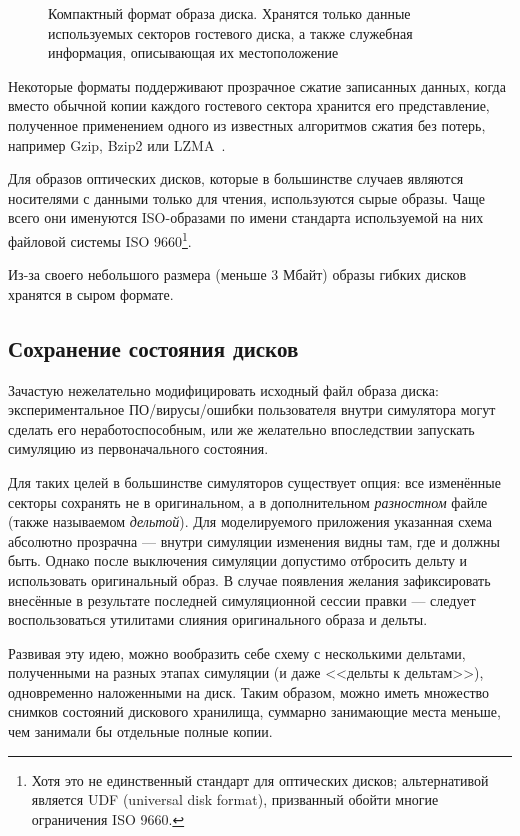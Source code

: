 \begin{figure}[htb]
    \centering
    \caption[Компактный формат образа диска]{Компактный формат образа диска. Хранятся только данные используемых секторов гостевого диска, а также служебная информация, описывающая их местоположение}
    \label{fig:compat}
\end{figure}

Некоторые форматы поддерживают прозрачное сжатие записанных данных, когда вместо обычной копии каждого гостевого сектора хранится его представление, полученное применением одного из известных алгоритмов сжатия без потерь, например Gzip, Bzip2 или LZMA~\cite{sayood2002lossless}.

Для образов оптических дисков, которые в большинстве  случаев являются носителями с данными только для чтения, используются сырые образы. Чаще всего они именуются ISO-образами по имени стандарта используемой на них файловой системы ISO 9660\footnote{Хотя это не единственный стандарт для оптических дисков; альтернативой является UDF (universal disk format), призванный обойти многие ограничения ISO 9660.}.

Из-за своего небольшого размера (меньше 3 Мбайт) образы гибких дисков хранятся в сыром формате.

\subsection{Сохранение состояния дисков}

Зачастую нежелательно модифицировать исходный файл образа диска: экспериментальное ПО/вирусы/ошибки пользователя внутри симулятора могут сделать его неработоспособным, или же желательно впоследствии запускать симуляцию из первоначального состояния.

Для таких целей в большинстве симуляторов существует опция: все изменённые секторы сохранять не в оригинальном, а в дополнительном \textit{разностном} файле (также называемом \textit{дельтой}). Для моделируемого приложения указанная схема абсолютно прозрачна --- внутри симуляции изменения видны там, где и должны быть. Однако после выключения симуляции допустимо отбросить дельту и использовать оригинальный образ. В случае появления желания зафиксировать внесённые в результате последней симуляционной сессии правки --- следует воспользоваться утилитами слияния оригинального образа и дельты.

Развивая эту идею, можно вообразить себе схему с несколькими дельтами, полученными на разных этапах симуляции (и даже <<дельты к дельтам>>), одновременно наложенными на диск. Таким образом, можно иметь множество снимков состояний дискового хранилища, суммарно занимающие места меньше, чем занимали бы отдельные полные копии.

